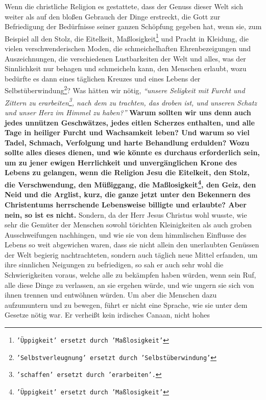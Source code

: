 Wenn die christliche Religion es gestattete, dass der Genuss dieser Welt sich
weiter als auf den bloßen Gebrauch der Dinge erstreckt, die Gott zur
Befriedigung der Bedürfnisse seiner ganzen Schöpfung gegeben hat, wenn sie, zum Beispiel
all den Stolz, die Eitelkeit, Maßlosigkeit\footnote{\texttt{'Üppigkeit' ersetzt
durch 'Maßlosigkeit'}}
und Pracht in Kleidung, die vielen
verschwenderischen Moden, die schmeichelhaften Ehrenbezeigungen und
Auszeichnungen, die verschiedenen Lustbarkeiten der Welt und alles, was der
Sinnlichkeit nur behagen und schmeicheln kann, den Menschen erlaubt, wozu
bedürfte es dann eines täglichen Kreuzes und eines Lebens
der Selbstüberwindung\footnote{\texttt{'Selbstverleugnung' ersetzt durch
'Selbstüberwindung'}}?
Was hätten wir nötig,
\textit{"`unsere Seligkeit mit Furcht und Zittern zu
erarbeiten\footnote{\texttt{'schaffen' ersetzt durch 'erarbeiten'.}},
nach dem zu trachten, das droben ist, und unseren Schatz und unser Herz im
Himmel
zu haben?"'} \label{ref:16_01_warum}
\textbf{Warum sollten wir uns denn auch jedes unnützen Geschwätzes, jedes
eitlen Scherzes enthalten, und alle Tage in heiliger Furcht und Wachsamkeit
leben? Und warum so viel Tadel, Schmach, Verfolgung und harte Behandlung
erdulden? Wozu sollte alles dieses dienen, und wie könnte es durchaus
erforderlich sein, um zu jener ewigen Herrlichkeit und unvergänglichen Krone
des Lebens zu gelangen, wenn die Religion Jesu die
Eitelkeit, den Stolz, die
Verschwendung, den Müßiggang, die Maßlosigkeit\footnote{\texttt{'Üppigkeit'
ersetzt durch 'Maßlosigkeit'}},
den Geiz, den Neid und die
Arglist, kurz, die ganze jetzt unter den Bekennern des Christentums
herrschende Lebensweise billigte und erlaubte? Aber nein, so ist es nicht.}
Sondern, da der Herr Jesus Christus wohl wusste, wie sehr die Gemüter der
Menschen sowohl törichten Kleinigkeiten als auch groben Ausschweifungen
nachhingen, und wie sie von dem himmlischen Einflusse des Lebens so weit
abgewichen waren, dass sie nicht allein den unerlaubten Genüssen der Welt
begierig nachtrachteten, sondern auch täglich neue Mittel erfanden, um ihre
sinnlichen Neigungen zu befriedigen, so sah er auch sehr wohl die
Schwierigkeiten voraus, welche alle zu bekämpfen haben würden, wenn sein Ruf,
alle diese Dinge zu verlassen, an sie ergehen würde, und wie ungern sie sich von
ihnen trennen und entwöhnen würden. Um aber die Menschen dazu aufzumuntern und
zu bewegen, führt er nicht eine Sprache, wie sie unter dem Gesetze nötig war. Er
verheißt kein irdisches Canaan, nicht hohes
